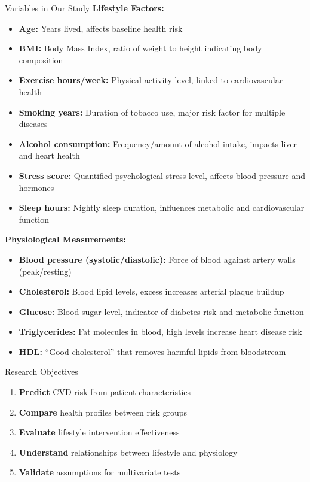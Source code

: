 \documentclass[aspectratio=169,ignorenonframetext]{beamer}
\begin{document}
\begin{frame}[shrink]{Variables in Our Study}
\textbf{Lifestyle Factors:}

\begin{itemize}
\item
  \textbf{Age:} Years lived, affects baseline health risk
\item
  \textbf{BMI:} Body Mass Index, ratio of weight to height indicating
  body composition
\item
  \textbf{Exercise hours/week:} Physical activity level, linked to
  cardiovascular health
\item
  \textbf{Smoking years:} Duration of tobacco use, major risk factor for
  multiple diseases
\item
  \textbf{Alcohol consumption:} Frequency/amount of alcohol intake,
  impacts liver and heart health
\item
  \textbf{Stress score:} Quantified psychological stress level, affects
  blood pressure and hormones
\item
  \textbf{Sleep hours:} Nightly sleep duration, influences metabolic and
  cardiovascular function
\end{itemize}

\textbf{Physiological Measurements:}

\begin{itemize}
\item
  \textbf{Blood pressure (systolic/diastolic):} Force of blood against
  artery walls (peak/resting)
\item
  \textbf{Cholesterol:} Blood lipid levels, excess increases arterial
  plaque buildup
\item
  \textbf{Glucose:} Blood sugar level, indicator of diabetes risk and
  metabolic function
\item
  \textbf{Triglycerides:} Fat molecules in blood, high levels increase
  heart disease risk
\item
  \textbf{HDL:} ``Good cholesterol'' that removes harmful lipids from
  bloodstream
\end{itemize}
\end{frame}

\begin{frame}{Research Objectives}
\begin{enumerate}
\item
  \textbf{Predict} CVD risk from patient characteristics
\item
  \textbf{Compare} health profiles between risk groups
\item
  \textbf{Evaluate} lifestyle intervention effectiveness
\item
  \textbf{Understand} relationships between lifestyle and physiology
\item
  \textbf{Validate} assumptions for multivariate tests
\end{enumerate}
\end{frame}
\end{document}

